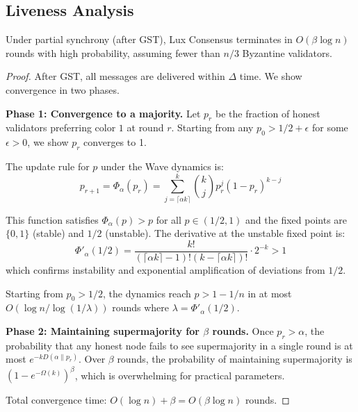 \subsection{Liveness Analysis}

\begin{theorem}[Liveness]
\label{thm:liveness}
Under partial synchrony (after GST), Lux Consensus terminates in $O(\beta \log n)$ rounds
with high probability, assuming fewer than $n/3$ Byzantine validators.
\end{theorem}

\begin{proof}
After GST, all messages are delivered within $\Delta$ time. We show convergence in two phases.

\textbf{Phase 1: Convergence to a majority.}
Let $p_r$ be the fraction of honest validators preferring color $1$ at round $r$. Starting
from any $p_0 > 1/2 + \epsilon$ for some $\epsilon > 0$, we show $p_r$ converges to 1.

The update rule for $p$ under the Wave dynamics is:
\begin{equation}
p_{r+1} = \Phi_\alpha(p_r) = \sum_{j=\lceil \alpha k \rceil}^{k} \binom{k}{j} p_r^j (1-p_r)^{k-j}
\end{equation}

This function satisfies $\Phi_\alpha(p) > p$ for all $p \in (1/2, 1)$ and the fixed points
are $\{0, 1\}$ (stable) and $1/2$ (unstable). The derivative at the unstable fixed point is:
\begin{equation}
\Phi'_\alpha(1/2) = \frac{k!}{(\lceil \alpha k \rceil - 1)!(k - \lceil \alpha k \rceil)!} \cdot 2^{-k} > 1
\end{equation}
which confirms instability and exponential amplification of deviations from $1/2$.

Starting from $p_0 > 1/2$, the dynamics reach $p > 1 - 1/n$ in at most
$O(\log n / \log(1/\lambda))$ rounds where $\lambda = \Phi'_\alpha(1/2)$.

\textbf{Phase 2: Maintaining supermajority for $\beta$ rounds.}
Once $p_r > \alpha$, the probability that any honest node fails to see supermajority
in a single round is at most $e^{-kD(\alpha \| p_r)}$. Over $\beta$ rounds, the
probability of maintaining supermajority is $(1 - e^{-\Omega(k)})^\beta$,
which is overwhelming for practical parameters.

Total convergence time: $O(\log n) + \beta = O(\beta \log n)$ rounds.
\end{proof}

